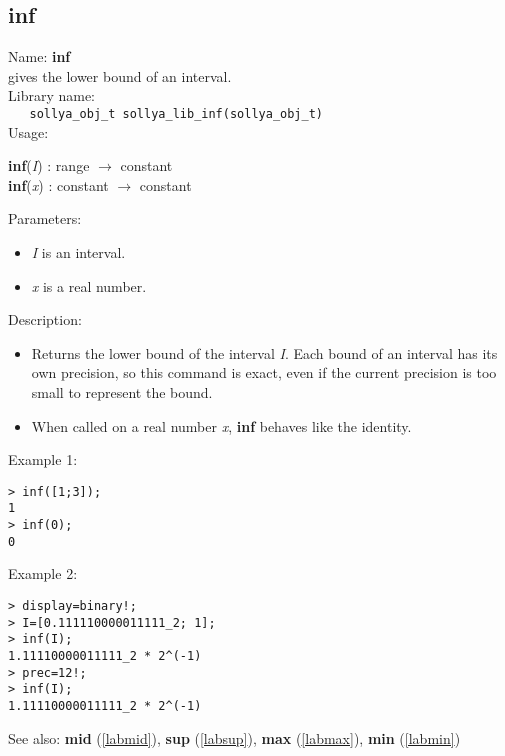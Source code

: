 \subsection{inf}
\label{labinf}
\noindent Name: \textbf{inf}\\
\phantom{aaa}gives the lower bound of an interval.\\[0.2cm]
\noindent Library name:\\
\verb|   sollya_obj_t sollya_lib_inf(sollya_obj_t)|\\[0.2cm]
\noindent Usage: 
\begin{center}
\textbf{inf}(\emph{I}) : \textsf{range} $\rightarrow$ \textsf{constant}\\
\textbf{inf}(\emph{x}) : \textsf{constant} $\rightarrow$ \textsf{constant}\\
\end{center}
Parameters: 
\begin{itemize}
\item \emph{I} is an interval.
\item \emph{x} is a real number.
\end{itemize}
\noindent Description: \begin{itemize}

\item Returns the lower bound of the interval \emph{I}. Each bound of an interval has its 
   own precision, so this command is exact, even if the current precision is too 
   small to represent the bound.

\item When called on a real number \emph{x}, \textbf{inf} behaves like the identity.
\end{itemize}
\noindent Example 1: 
\begin{center}\begin{minipage}{15cm}\begin{Verbatim}[frame=single,commandchars=\\\|\~]
> inf([1;3]);
1
> inf(0);
0
\end{Verbatim}
\end{minipage}\end{center}
\noindent Example 2: 
\begin{center}\begin{minipage}{15cm}\begin{Verbatim}[frame=single,commandchars=\\\|\~]
> display=binary!;
> I=[0.111110000011111_2; 1];
> inf(I);
1.11110000011111_2 * 2^(-1)
> prec=12!;
> inf(I);
1.11110000011111_2 * 2^(-1)
\end{Verbatim}
\end{minipage}\end{center}
See also: \textbf{mid} (\ref{labmid}), \textbf{sup} (\ref{labsup}), \textbf{max} (\ref{labmax}), \textbf{min} (\ref{labmin})
